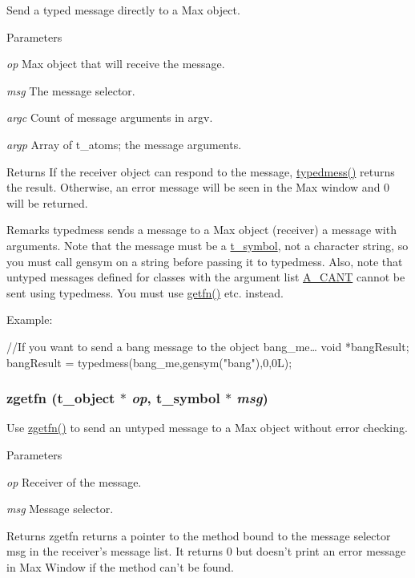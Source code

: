 Send a typed message directly to a Max object. 
\begin{DoxyParams}{Parameters}
\item[{\em op}]Max object that will receive the message. \item[{\em msg}]The message selector. \item[{\em argc}]Count of message arguments in argv. \item[{\em argp}]Array of t\_\-atoms; the message arguments. \end{DoxyParams}
\begin{DoxyReturn}{Returns}
If the receiver object can respond to the message, \hyperlink{group__class__old_ga78c60eb0068bce55eaa635e206cba52e}{typedmess()} returns the result. Otherwise, an error message will be seen in the Max window and 0 will be returned.
\end{DoxyReturn}
\begin{DoxyRemark}{Remarks}
typedmess sends a message to a Max object (receiver) a message with arguments. Note that the message must be a \hyperlink{structt__symbol}{t\_\-symbol}, not a character string, so you must call gensym on a string before passing it to typedmess. Also, note that untyped messages defined for classes with the argument list \hyperlink{group__atom_gga8aa6700e9f00b132eb376db6e39ade47af48193ec36e53b1507d81c49873c8d7a}{A\_\-CANT} cannot be sent using typedmess. You must use \hyperlink{group__class__old_gafa477f96b3a02c0ecbca2b5aa14b9ecb}{getfn()} etc. instead.
\end{DoxyRemark}
Example: 
\begin{DoxyCode}
    //If you want to send a bang message to the object bang_me… 
    void *bangResult; 
    bangResult = typedmess(bang_me,gensym("bang"),0,0L);
\end{DoxyCode}
 \hypertarget{group__class__old_ga54a45bcc841c2033467be14e6861b548}{
\subsubsection[{zgetfn}]{ zgetfn ({\bf t\_\-object} $\ast$ {\em op}, \/  {\bf t\_\-symbol} $\ast$ {\em msg})}}
\label{group__class__old_ga54a45bcc841c2033467be14e6861b548}


Use \hyperlink{group__class__old_ga54a45bcc841c2033467be14e6861b548}{zgetfn()} to send an untyped message to a Max object without error checking. 
\begin{DoxyParams}{Parameters}
\item[{\em op}]Receiver of the message. \item[{\em msg}]Message selector. \end{DoxyParams}
\begin{DoxyReturn}{Returns}
zgetfn returns a pointer to the method bound to the message selector msg in the receiver’s message list. It returns 0 but doesn’t print an error message in Max Window if the method can’t be found. 
\end{DoxyReturn}
